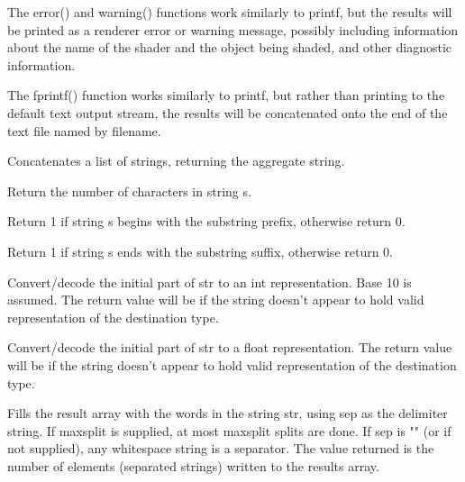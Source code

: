 \documentclass[11pt,letterpaper]{book}
\begin{document}
 
The {\cf error()} and {\cf warning()} functions work similarly to {\cf printf}, but the
results will be printed as a renderer error or warning message, possibly including
information about the name of the shader and the object being shaded,
and other diagnostic information.
\apiend

The {\cf fprintf()} function works similarly to {\cf printf}, but rather
than printing to the default text output stream, the results will be
concatenated onto the end of the text file named by {\cf filename}.
\apiend

Concatenates a list of strings, returning the aggregate string.
\apiend

Return the number of characters in string {\ce s}.
\apiend

Return 1 if string {\cf s} begins with the substring {\cf prefix},
otherwise return 0.
\apiend

Return 1 if string {\cf s} ends with the substring {\cf suffix},
otherwise return 0.
\apiend

Convert/decode the initial part of {\cf str} to an {\cf int} 
representation.  Base 10 is assumed.
The return value will be {} if the string doesn't appear to hold
valid representation of the destination type.
\apiend

Convert/decode the initial part of {\cf str} to a {\cf float} representation.
The return value will be {} if the string doesn't appear to hold
valid representation of the destination type.
\apiend


Fills the {\cf result} array with the words in the string {\cf str},
using {\cf sep} as the delimiter string.  If {\cf maxsplit} is supplied,
at most {\cf maxsplit} splits are done.  If {\cf sep} is {\cf ""} (or if
not supplied), any whitespace string is a separator.  The value returned
is the number of elements (separated strings) written to the {\cf results}
array.
\apiend
\end{document}
